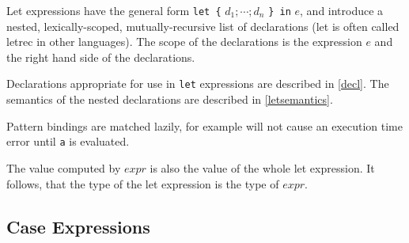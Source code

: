 \begin{flushleft}
  \bracea{}  \bracez{}  
\end{flushleft}

Let expressions have the general form
\texttt{let \{} $d_1 ; \cdots{} ; d_n$  \texttt{\} in} $e$,
and introduce a nested,
lexically-scoped, mutually-recursive list of declarations
(let is often called letrec in other languages).
The scope of the declarations is the expression $e$ and the right hand side of the declarations.

Declarations appropriate for use in \texttt{let} expressions are described in \autoref{decl}. The semantics of the nested declarations are described in \autoref{letsemantics}.

Pattern bindings are matched lazily, for example  will not cause an execution time error until \texttt{a} is evaluated.

The value computed by $expr$ is also the value of the whole let expression. It follows, that the type of the let expression is the type of $expr$.

\subsection{Case Expressions} \label{caseex} 

\begin{flushleft}
     \bracea{}  \bracez{}\\
  \sym{->} 
  \alt {} 
  \alt {}  \bracea{}  \bracez{}\\
 \\
 \sym{$|$}  \sym{=} 
\end{flushleft}

